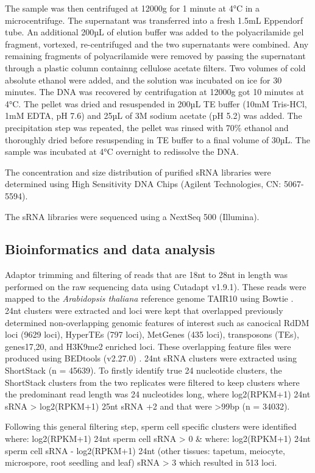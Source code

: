 The sample was then centrifuged at 12000g for 1 minute at 4°C in a microcentrifuge. The supernatant was transferred into a fresh 1.5mL Eppendorf tube. An additional 200µL of elution buffer was added to the polyacrilamide gel fragment, vortexed, re-centrifuged and the two supernatants were combined. Any remaining fragments of polyacrilamide were removed  by passing the supernatant through a plastic column containng cellulose acetate filters. Two volumes of cold absolute ethanol were added, and the solution was incubated on ice for 30 minutes. The DNA was recovered by centrifugation at 12000g got 10 minutes at 4°C. The pellet was dried and resuspended in 200µL TE buffer (10mM Tris-HCl, 1mM EDTA, pH 7.6) and 25µL of 3M sodium acetate (pH 5.2) was added. The precipitation step was repeated, the pellet was rinsed with 70\% ethanol and thoroughly dried before resuspending in TE buffer to a final volume of 30µL. The sample was incubated at 4°C overnight to redissolve the DNA.

The concentration and size distribution of purified sRNA libraries were determined using  High Sensitivity DNA Chips (Agilent Technologies, CN: 5067-5594).

The sRNA libraries were sequenced using a NextSeq 500 (Illumina).

\subsection{Bioinformatics and data analysis}

Adaptor trimming and filtering of reads that are 18nt to 28nt in length was performed on the raw sequencing data using Cutadapt \cite{RN88} v1.9.1). These reads were mapped to the \textit{Arabidopsis thaliana} reference genome TAIR10 using Bowtie \cite{RN89}. 24nt clusters were extracted and loci were kept that overlapped previously determined non-overlapping genomic features of interest such as canocical RdDM loci (9629 loci), HyperTEs (797 loci), MetGenes (435 loci), transposons (TEs), genes17,20, and H3K9me2 enriched loci. These overlapping feature files were produced using BEDtools (v2.27.0) \cite{RN90}. 24nt sRNA clusters were extracted using ShortStack \cite{RN142} (n = 45639). To firstly identify true 24 nucleotide clusters, the ShortStack clusters from the two replicates were filtered to keep clusters where the predominant read length was 24 nucleotides long, where log2(RPKM+1) 24nt sRNA > log2(RPKM+1) 25nt sRNA +2 and that were >99bp (n = 34032).

Following this general filtering step, sperm cell specific clusters were identified where:
log2(RPKM+1) 24nt sperm cell sRNA > 0 \& where:
log2(RPKM+1) 24nt sperm cell sRNA - log2(RPKM+1) 24nt (other tissues: tapetum, meiocyte, microspore, root seedling and leaf) sRNA > 3 which resulted in 513 loci.

